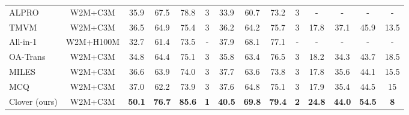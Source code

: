 \documentclass[10pt,twocolumn,letterpaper]{article}
\begin{document}
{\begin{table*}[t]
{\begin{tabular}{cccccccccccccc}
\multicolumn{1}{l|}{ALPRO \cite{li2022alignandprompt}} & \multicolumn{1}{c|}{W2M+C3M} & 35.9 & 67.5 & 78.8 & \multicolumn{1}{c|}{3} & 33.9 & 60.7 & 73.2 & \multicolumn{1}{c|}{3} & - & - & - & - \\
\multicolumn{1}{l|}{TMVM \cite{lin2022text}} & \multicolumn{1}{c|}{W2M+C3M} & 36.5 & 64.9 & 75.4 & \multicolumn{1}{c|}{3} & 36.2 & 64.2 & 75.7 & \multicolumn{1}{c|}{3} & 17.8 & 37.1 & 45.9 & 13.5 \\
\multicolumn{1}{l|}{All-in-1 \cite{wang2022all}} & \multicolumn{1}{c|}{W2M+H100M} & 32.7 & 61.4 & 73.5 & \multicolumn{1}{c|}{-} & 37.9 & 68.1 & 77.1 & \multicolumn{1}{c|}{-} & - & - & - & - \\
\multicolumn{1}{l|}{OA-Trans \cite{wang2022object}} & \multicolumn{1}{c|}{W2M+C3M}& 34.8 & 64.4 & 75.1& \multicolumn{1}{c|}{3}  & 35.8 & 63.4 & 76.5 & \multicolumn{1}{c|}{3} & 18.2 & 34.3 & 43.7 & 18.5 \\
\multicolumn{1}{l|}{MILES \cite{ge2022miles}} & \multicolumn{1}{c|}{W2M+C3M}& 36.6 & 63.9 & 74.0 & \multicolumn{1}{c|}{3}  & 37.7 & 63.6 & 73.8 & \multicolumn{1}{c|}{3} & 17.8 & 35.6 & 44.1 & 15.5 \\ 
\multicolumn{1}{l|}{MCQ \cite{ge2022bridging}} & \multicolumn{1}{c|}{W2M+C3M} & 37.0 & 62.2 & 73.9  & \multicolumn{1}{c|}{3} & 37.6 & 64.8 & 75.1 & \multicolumn{1}{c|}{3} & 17.9 & 35.4 & 44.5 & 15 \\ 

\midrule
\multicolumn{1}{l|}{Clover (ours) } & \multicolumn{1}{c|}{W2M+C3M} & \textbf{50.1} & \textbf{76.7} & \textbf{85.6} & \multicolumn{1}{c|}{\textbf{1}} & \textbf{40.5} & \textbf{69.8} & \textbf{79.4} & \multicolumn{1}{c|}{\textbf{2}} & \textbf{24.8} & \textbf{44.0} & \textbf{54.5} & \textbf{8} \\ \midrule


\end{tabular}}
\end{table*}}
\end{document}
